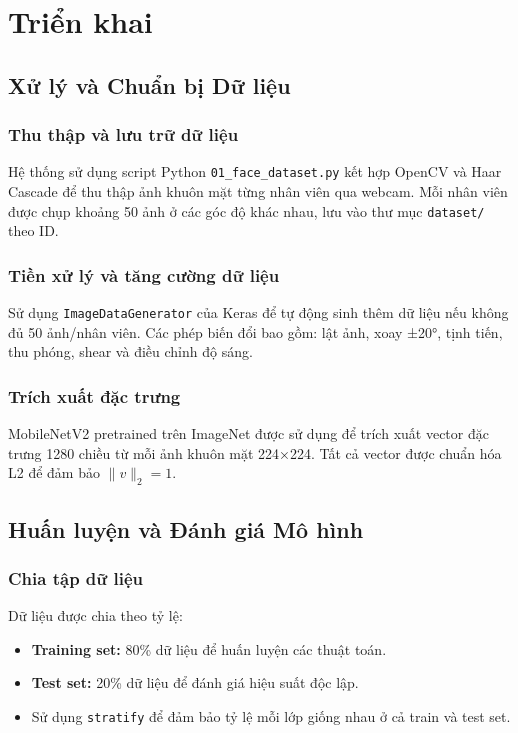 \documentclass[a4paper]{book}
\begin{document}
\section{Triển khai}

\subsection{Xử lý và Chuẩn bị Dữ liệu}

\subsubsection{Thu thập và lưu trữ dữ liệu}
Hệ thống sử dụng script Python \texttt{01\_face\_dataset.py} kết hợp OpenCV và Haar Cascade để thu thập ảnh khuôn mặt từng nhân viên qua webcam. Mỗi nhân viên được chụp khoảng 50 ảnh ở các góc độ khác nhau, lưu vào thư mục \texttt{dataset/} theo ID.

\subsubsection{Tiền xử lý và tăng cường dữ liệu}
Sử dụng \texttt{ImageDataGenerator} của Keras để tự động sinh thêm dữ liệu nếu không đủ 50 ảnh/nhân viên. Các phép biến đổi bao gồm: lật ảnh, xoay ±20°, tịnh tiến, thu phóng, shear và điều chỉnh độ sáng.

\subsubsection{Trích xuất đặc trưng}
MobileNetV2 pretrained trên ImageNet được sử dụng để trích xuất vector đặc trưng 1280 chiều từ mỗi ảnh khuôn mặt 224×224. Tất cả vector được chuẩn hóa L2 để đảm bảo $\|v\|_2 = 1$.

\subsection{Huấn luyện và Đánh giá Mô hình}

\subsubsection{Chia tập dữ liệu}
Dữ liệu được chia theo tỷ lệ:
\begin{itemize}
    \item \textbf{Training set:} 80\% dữ liệu để huấn luyện các thuật toán.
    \item \textbf{Test set:} 20\% dữ liệu để đánh giá hiệu suất độc lập.
    \item Sử dụng \texttt{stratify} để đảm bảo tỷ lệ mỗi lớp giống nhau ở cả train và test set.
\end{itemize}
\end{document}
